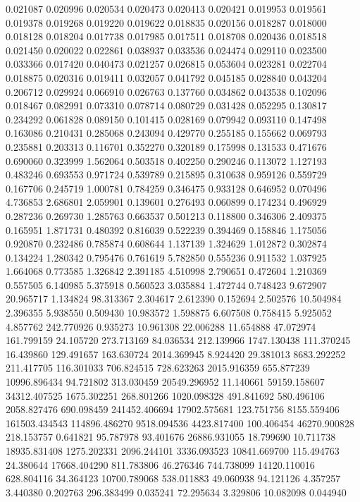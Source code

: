 0.021087
0.020996
0.020534
0.020473
0.020413
0.020421
0.019953
0.019561
0.019378
0.019268
0.019220
0.019622
0.018835
0.020156
0.018287
0.018000
0.018128
0.018204
0.017738
0.017985
0.017511
0.018708
0.020436
0.018518
0.021450
0.020022
0.022861
0.038937
0.033536
0.024474
0.029110
0.023500
0.033366
0.017420
0.040473
0.021257
0.026815
0.053604
0.023281
0.022704
0.018875
0.020316
0.019411
0.032057
0.041792
0.045185
0.028840
0.043204
0.206712
0.029924
0.066910
0.026763
0.137760
0.034862
0.043538
0.102096
0.018467
0.082991
0.073310
0.078714
0.080729
0.031428
0.052295
0.130817
0.234292
0.061828
0.089150
0.101415
0.028169
0.079942
0.093110
0.147498
0.163086
0.210431
0.285068
0.243094
0.429770
0.255185
0.155662
0.069793
0.235881
0.203313
0.116701
0.352270
0.320189
0.175998
0.131533
0.471676
0.690060
0.323999
1.562064
0.503518
0.402250
0.290246
0.113072
1.127193
0.483246
0.693553
0.971724
0.539789
0.215895
0.310638
0.959126
0.559729
0.167706
0.245719
1.000781
0.784259
0.346475
0.933128
0.646952
0.070496
4.736853
2.686801
2.059901
0.139601
0.276493
0.060899
0.174234
0.496929
0.287236
0.269730
1.285763
0.663537
0.501213
0.118800
0.346306
2.409375
0.165951
1.871731
0.480392
0.816039
0.522239
0.394469
0.158846
1.175056
0.920870
0.232486
0.785874
0.608644
1.137139
1.324629
1.012872
0.302874
0.134224
1.280342
0.795476
0.761619
5.782850
0.555236
0.911532
1.037925
1.664068
0.773585
1.326842
2.391185
4.510998
2.790651
0.472604
1.210369
0.557505
6.140985
5.375918
0.560523
3.035884
1.472744
0.748423
9.672907
20.965717
1.134824
98.313367
2.304617
2.612390
0.152694
2.502576
10.504984
2.396355
5.938550
0.509430
10.983572
1.598875
6.607508
0.758415
5.925052
4.857762
242.770926
0.935273
10.961308
22.006288
11.654888
47.072974
161.799159
24.105720
273.713169
84.036534
212.139966
1747.130438
111.370245
16.439860
129.491657
163.630724
2014.369945
8.924420
29.381013
8683.292252
211.417705
116.301033
706.824515
728.623263
2015.916359
655.877239
10996.896434
94.721802
313.030459
20549.296952
11.140661
59159.158607
34312.407525
1675.302251
268.801266
1020.098328
491.841692
580.496106
2058.827476
690.098459
241452.406694
17902.575681
123.751756
8155.559406
161503.434543
114896.486270
9518.094536
4423.817400
100.406454
46270.900828
218.153757
0.641821
95.787978
93.401676
26886.931055
18.799690
10.711738
18935.831408
1275.202331
2096.244101
3336.093523
10841.669700
115.494763
24.380644
17668.404290
811.783806
46.276346
744.738099
14120.110016
628.804116
34.364123
10700.789068
538.011883
49.060938
94.121126
4.357257
3.440380
0.202763
296.383499
0.035241
72.295634
3.329806
10.082098
0.044940
